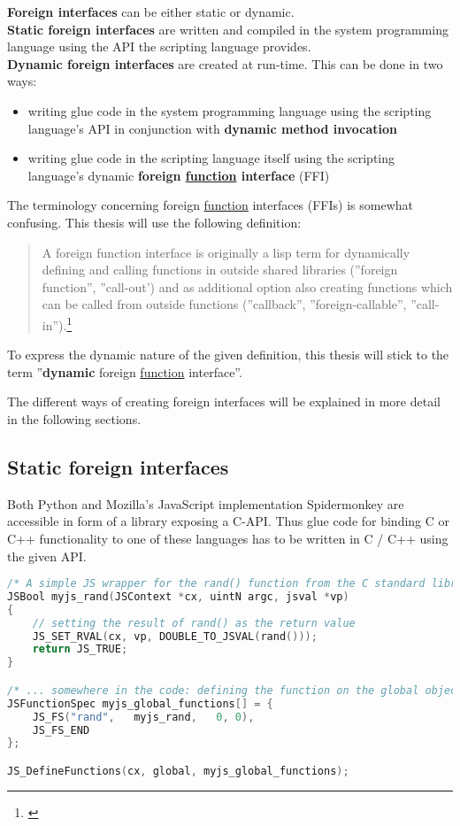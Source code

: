 \textbf{Foreign interfaces} can be either static or dynamic.\\
\textbf{Static foreign interfaces} are written and compiled in the system programming language using the API the scripting language provides.\\
\textbf{Dynamic foreign interfaces} are created at run-time. This can be done in two ways:
\begin{itemize}
\item writing glue code in the system programming language using the scripting language's API in conjunction with \textbf{dynamic method invocation}
\item writing glue code in the scripting language itself using the scripting language's dynamic \textbf{foreign \underline{function} interface} (FFI)
\end{itemize}

The terminology concerning foreign \underline{function} interfaces (FFIs) is somewhat confusing. This thesis will use the following definition:

\begin{quotation}
A foreign function interface is originally a lisp term for dynamically defining and calling functions in outside shared libraries (''foreign function'', ''call-out') and as additional option also creating functions which can be called from outside functions (''callback'', ''foreign-callable'', ''call-in'').\footnote{\citep{DesignFFI}}
\end{quotation}

To express the dynamic nature of the given definition, this thesis will stick to the term ''\textbf{dynamic} foreign \underline{function} interface''.

The different ways of creating foreign interfaces will be explained in more detail in the following sections.

\subsection{Static foreign interfaces}

Both Python and Mozilla's JavaScript implementation Spidermonkey are accessible in form of a library exposing a C-API. Thus glue code for binding C or C++ functionality to one of these languages has to be written in C / C++ using the given API.

\begin{lstlisting}[language=C++, caption=Exposing a C function to Spidermonkey]
/* A simple JS wrapper for the rand() function from the C standard library */
JSBool myjs_rand(JSContext *cx, uintN argc, jsval *vp)
{
    // setting the result of rand() as the return value
    JS_SET_RVAL(cx, vp, DOUBLE_TO_JSVAL(rand()));
    return JS_TRUE;
}

/* ... somewhere in the code: defining the function on the global object so it can be used from the script */
JSFunctionSpec myjs_global_functions[] = {
    JS_FS("rand",   myjs_rand,   0, 0),
    JS_FS_END
};

JS_DefineFunctions(cx, global, myjs_global_functions);
\end{lstlisting}

